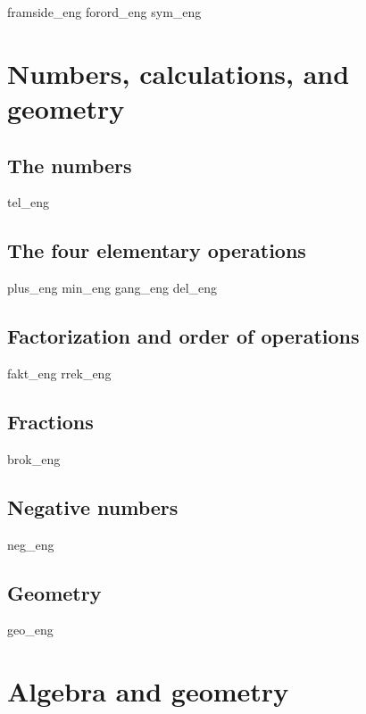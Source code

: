 




{framside_eng}
{forord_eng}
{sym_eng}
\newpage

{\footnotesize \tableofcontents}
\newpage
\part{Numbers, calculations, and geometry \label{Del1}}

\chapter{The numbers \label{Talavare}}
\newpage
{tel_eng}
%
\chapter{The four elementary operations \label{Rekneartane}}
\newpage
{plus_eng}
{min_eng}
{gang_eng}
{del_eng}
\chapter{Factorization and order of operations}
\newpage
{fakt_eng}
{rrek_eng}

\chapter{Fractions}
\newpage
{brok_eng}

\chapter{Negative numbers \label{Negtal}}
\newpage
{neg_eng}


\chapter{Geometry}
\newpage
{geo_eng}

\part{Algebra and geometry \label{Del2}}
